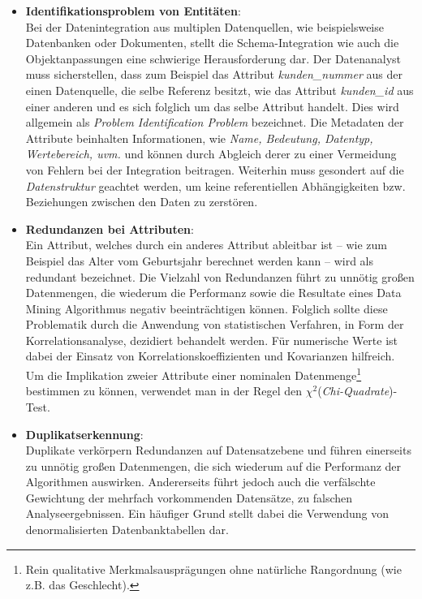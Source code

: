 \begin{itemize}
\item \textbf{Identifikationsproblem von Entitäten}:
\\ Bei der Datenintegration aus multiplen Datenquellen, wie beispielsweise Datenbanken oder Dokumenten, stellt die Schema-Integration wie auch die Objektanpassungen eine schwierige Herausforderung dar. Der Datenanalyst muss sicherstellen, dass zum Beispiel das Attribut \textit{kunden\_nummer} aus der einen Datenquelle, die selbe Referenz besitzt, wie das Attribut \textit{kunden\_id} aus einer anderen und es sich folglich um das selbe Attribut handelt. Dies wird allgemein als \textit{Problem Identification Problem} bezeichnet. Die Metadaten der Attribute beinhalten Informationen, wie \textit{Name, Bedeutung, Datentyp, Wertebereich, uvm.} und können durch Abgleich derer zu einer Vermeidung von Fehlern bei der Integration beitragen. Weiterhin muss gesondert auf die \textit{Datenstruktur} geachtet werden, um keine referentiellen Abhängigkeiten bzw. Beziehungen zwischen den Daten zu zerstören. 

\item \textbf{Redundanzen bei Attributen}:
\\ Ein Attribut, welches durch ein anderes Attribut ableitbar ist -- wie zum Beispiel das Alter vom Geburtsjahr berechnet werden kann -- wird als redundant bezeichnet. Die Vielzahl von Redundanzen führt zu unnötig großen Datenmengen, die wiederum die Performanz sowie die Resultate eines Data Mining Algorithmus negativ beeinträchtigen können. Folglich sollte diese Problematik durch die Anwendung von statistischen Verfahren, in Form der Korrelationsanalyse, dezidiert behandelt werden. Für numerische Werte ist dabei der Einsatz von Korrelationskoeffizienten und Kovarianzen hilfreich. Um die Implikation zweier Attribute einer nominalen Datenmenge\footnote{Rein qualitative Merkmalsausprägungen ohne natürliche Rangordnung (wie z.B. das Geschlecht).} bestimmen zu können, verwendet man in der Regel den $\chi^2$(\textit{Chi-Quadrate})-Test. 

\item \textbf{Duplikatserkennung}:
\\ Duplikate verkörpern Redundanzen auf Datensatzebene und führen einerseits zu unnötig großen Datenmengen, die sich wiederum auf die Performanz der Algorithmen auswirken. Andererseits führt jedoch auch die verfälschte Gewichtung der mehrfach vorkommenden Datensätze, zu falschen Analyseergebnissen. Ein häufiger Grund stellt dabei die Verwendung von denormalisierten Datenbanktabellen dar.


\end{itemize}
